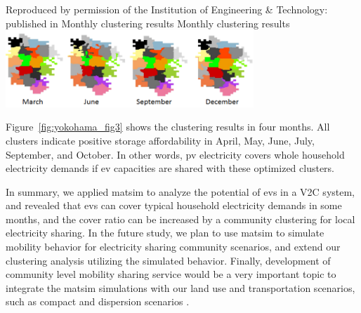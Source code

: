{Reproduced by permission of the Institution of Engineering \& Technology: published in \citet[][Figure~10.a]{YamagataSeya_ITSIET_2015}}
%
\createfigure%
{Monthly clustering results}%
{Monthly clustering results}%
{\label{fig:yokohama_fig3}}%
{\includegraphics[width=0.7\textwidth, angle=0]{./scenarios/figures/yokohama_fig3.png}}%
{}

Figure~\ref{fig:yokohama_fig3} shows the clustering results in four months. All clusters indicate positive storage affordability in April, May, June, July, September, and October. In other words, \gls{pv} electricity covers whole household electricity demands if \gls{ev} capacities are shared with these optimized clusters.

In summary, we applied \gls{matsim} to analyze the potential of \glspl{ev} in a V2C system, and revealed that \glspl{ev} can cover typical household electricity demands in some months, and the cover ratio can be increased by a community clustering for local electricity sharing. In the future study, we plan to use \gls{matsim} to simulate mobility behavior for electricity sharing community scenarios, and extend our clustering analysis utilizing the simulated behavior. Finally, development of community level mobility sharing service would be a very important topic to integrate the \gls{matsim} simulations with our land use and transportation scenarios, such as compact and dispersion scenarios \citep[see][]{YamagataEtAl_AoG_2013}.

